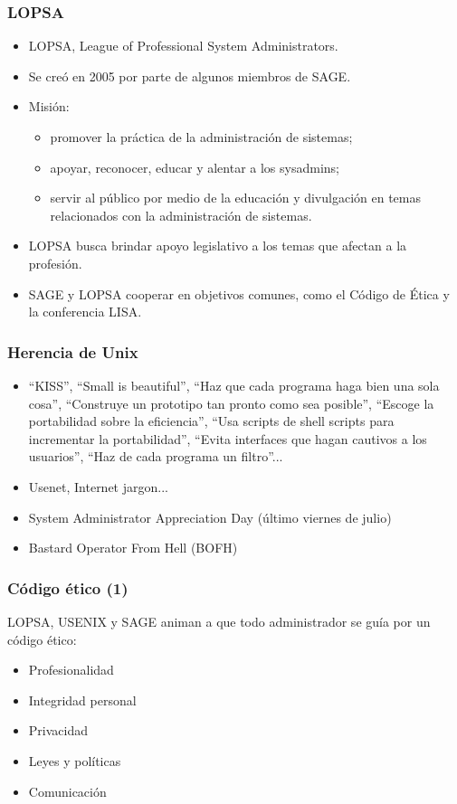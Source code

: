 \documentclass{beamer}
\begin{document}
\begin{frame}
\frametitle{LOPSA}

\begin{itemize}
\item LOPSA, League of Professional System Administrators.
\item Se creó en 2005 por parte de algunos miembros de SAGE. 
\item Misión: 
	\begin{itemize}
	\item promover la práctica de la administración de sistemas; 
	\item apoyar, reconocer, educar y alentar a los sysadmins; 	
 	\item servir al público por medio de la educación y divulgación en temas relacionados con la administración de sistemas.
	\end{itemize}
\item LOPSA busca brindar apoyo legislativo a los temas que afectan a la profesión.
\item SAGE y LOPSA cooperar en objetivos comunes, como el Código de Ética y la conferencia LISA.

\end{itemize}
\end{frame}


\begin{frame}
\frametitle{Herencia de Unix}

\begin{itemize}
\item ``KISS'', ``Small is beautiful'', ``Haz que cada programa haga bien una sola cosa'', ``Construye un prototipo tan pronto como sea posible'', ``Escoge la portabilidad sobre la eficiencia'', ``Usa scripts de shell scripts para incrementar la portabilidad'', ``Evita interfaces que hagan cautivos a los usuarios'', ``Haz de cada programa un filtro''...
\item Usenet, Internet jargon... 
\item System Administrator Appreciation Day (último viernes de julio)
\item Bastard Operator From Hell (BOFH)
\end{itemize}
\end{frame}



\begin{frame}
\frametitle{Código ético (1)}

LOPSA, USENIX y SAGE animan a que todo administrador se guía por un código ético:  

\begin{itemize}
\item Profesionalidad
\item Integridad personal
\item Privacidad
\item Leyes y políticas
\item Comunicación
\end{itemize}
\end{frame}
\end{document}
